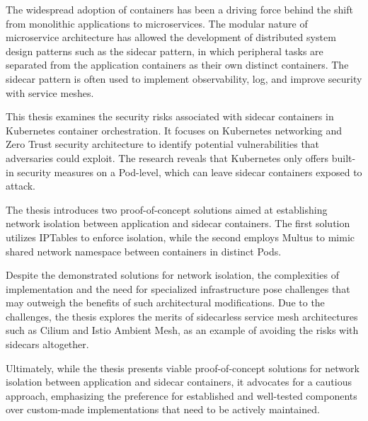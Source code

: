 \documentclass[english, 12pt, a4paper, sci, utf8, a-2b, online]{aaltothesis}
\date{29.12.2023}
\begin{document}
\makecoverpage

\makecopyrightpage

\clearpage



\begin{abstractpage}[english]
  The widespread adoption of containers has been a driving force behind the shift from monolithic applications to microservices.
  The modular nature of microservice architecture has allowed the development of distributed system design patterns such as the sidecar pattern, in which peripheral tasks are separated from the application containers as their own distinct containers.
  The sidecar pattern is often used to implement observability, log, and improve security with service meshes.

  This thesis examines the security risks associated with sidecar containers in Kubernetes container orchestration.
  It focuses on Kubernetes networking and Zero Trust security architecture to identify potential vulnerabilities that adversaries could exploit.
  The research reveals that Kubernetes only offers built-in security measures on a Pod-level, which can leave sidecar containers exposed to attack.

  The thesis introduces two proof-of-concept solutions aimed at establishing network isolation between application and sidecar containers.
  The first solution utilizes IPTables to enforce isolation, while the second employs Multus to mimic shared network namespace between containers in distinct Pods.

  Despite the demonstrated solutions for network isolation, the complexities of implementation and the need for specialized infrastructure pose challenges that may outweigh the benefits of such architectural modifications.
  Due to the challenges, the thesis explores the merits of sidecarless service mesh architectures such as Cilium and Istio Ambient Mesh, as an example of avoiding the risks with sidecars altogether.

  Ultimately, while the thesis presents viable proof-of-concept solutions for network isolation between application and sidecar containers, it advocates for a cautious approach, emphasizing the preference for established and well-tested components over custom-made implementations that need to be actively maintained.
\end{abstractpage}
\end{document}
